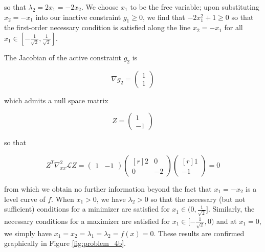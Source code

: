 \begin{solution}
    so that $\lambda_2 = 2 x_1 = -2 x_2$. We choose $x_1$ to be the free variable; upon substituting $x_2 = -x_1$ into 
    our inactive constraint $g_1 \ge 0$, we find that $-2 x_1^2 + 1 \ge 0$ so that the first-order necessary condition 
    is satisfied along the line $x_2 = -x_1$ for all $x_1 \in \left[ -\frac{1}{\sqrt{2}}, \frac{1}{\sqrt{2}} \right]$.

    The Jacobian of the active constraint $g_2$ is

    $$
    \nabla g_2 = \begin{pmatrix*}
        1 \\
        1
    \end{pmatrix*}
    $$

    which admits a null space matrix

    $$
    Z = \begin{pmatrix*}
         1 \\
        -1
    \end{pmatrix*}
    $$

    so that 

    $$
    Z^T \nabla_{xx}^2 \mathcal{L} Z = \begin{pmatrix*}
        1 & -1
    \end{pmatrix*} \begin{pmatrix*}[r]
        2 & 0 \\
        0 & -2
    \end{pmatrix*} \begin{pmatrix*}[r]
        1 \\
        -1
    \end{pmatrix*} = 0
    $$

    from which we obtain no further information beyond the fact that $x_1 = -x_2$ is a level curve of $f$. When 
    $x_1 > 0$, we have $\lambda_2 > 0$ so that the necessary (but not sufficient) conditions for a minimizer are 
    satisfied for $x_1 \in \mathopen( 0, \frac{1}{\sqrt{2}}\mathclose ]$. Similarly, the necessary conditions for a 
    maximizer are satisfied for $x_1 \in \mathopen[ -\frac{1}{\sqrt{2}}, 0 \mathclose)$ and at $x_1 = 0$, we simply have
    $x_1 = x_2 = \lambda_1 = \lambda_2 = f(x) = 0$. These results are confirmed graphically in Figure 
    \ref{fig:problem_4b}.


\end{solution}
